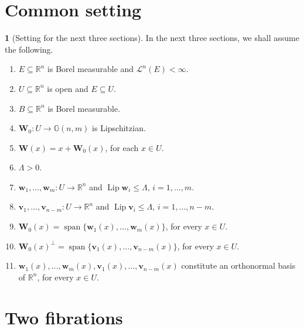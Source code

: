 \documentclass[11pt]{article}
\newcounter{cdrthm}[section]
\theoremstyle{definition}
\theoremstyle{jepanonymous}
\newtheorem{jepempty}[cdrthm]{}
\newenvironment{enonce}[2][remark]{\begin{jepempty}[#2]}{\end{jepempty}}
\theoremstyle{plain}
\newenvironment{Empty}[2][\null]{%
\begin{enonce}[remark]{#1}#2}
{\end{enonce}}
\newcommand{\R}{\mathbb{R}}
\newcommand{\Rn}{\R^n}
\newcommand{\calL}{\mathscr{L}}
\newcommand{\bW}{{\boldsymbol{W}}}
\newcommand{\bv}{{\boldsymbol{v}}}
\newcommand{\bw}{{\boldsymbol{w}}}
\newcommand{\bG}{\mathbb{G}}
\DeclareMathOperator{\rmLip}{\mathrm{Lip}}
\DeclareMathOperator{\rmspan}{\mathrm{span}}
\let\subset\subseteq
\begin{document}
\section{Common setting}

\begin{Empty}[Setting for the next three sections]
\label{31}
In the next three sections, we shall assume the following.
\begin{enumerate}
\item $E \subset \Rn$ is Borel measurable and $\calL^n(E) < \infty$.
\item $U \subset \Rn$ is open and $E \subset U$.
\item $B \subset \Rn$ is Borel measurable.
\item $\bW_0: U \to \bG(n,m)$ is Lipschitzian.
\item $\bW(x) = x + \bW_0(x)$, for each $x \in U$.
\item $\Lambda > 0$.
\item $\bw_1,\ldots,\bw_m: U \to \Rn$ and $\rmLip \bw_i \leq \Lambda$, $i=1,\ldots,m$.
\item $\bv_1,\ldots,\bv_{n-m}: U \to \Rn$ and $\rmLip \bv_i \leq \Lambda$, $i=1,\ldots,n-m$.
\item $\bW_0(x) = \rmspan \{ \bw_1(x),\ldots,\bw_m(x)\}$, for every $x \in U$.
\item $\bW_0(x)^\perp = \rmspan \{ \bv_1(x),\ldots,\bv_{n-m}(x)\}$, for every $x \in U$.
\item $\bw_1(x),\ldots,\bw_m(x),\bv_1(x),\ldots,\bv_{n-m}(x)$ constitute an orthonormal basis of $\Rn$, for every $x \in U$.
\end{enumerate}
\end{Empty}

\section{Two fibrations}
\end{document}

